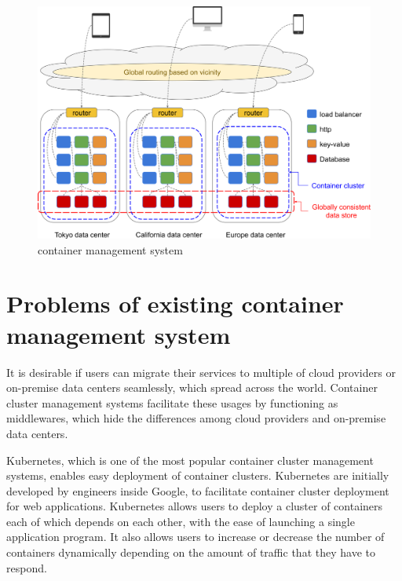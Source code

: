\begin{figure}[h]
\begin{center}
\includegraphics[width=0.9\columnwidth]{Figs/global_container_infrastructure}
\end{center}
\caption{
container management system
}

\label{fig:global_container_infrastructure}
\end{figure}



\section{Problems of existing container management system}

It is desirable if users can migrate their services to multiple of cloud providers or on-premise data centers seamlessly, which spread across the world.
Container cluster management systems facilitate these usages by functioning as middlewares, which hide the differences among cloud providers and on-premise data centers.

Kubernetes\cite{K8s2017}, which is one of the most popular container cluster management systems, enables easy deployment of container clusters.
Kubernetes are initially developed by engineers inside Google, to facilitate container cluster deployment for web applications.
Kubernetes allows users to deploy a cluster of containers each of which depends on each other, with the ease of launching a single application program.
It also allows users to increase or decrease the number of containers dynamically depending on the amount of traffic that they have to respond.

